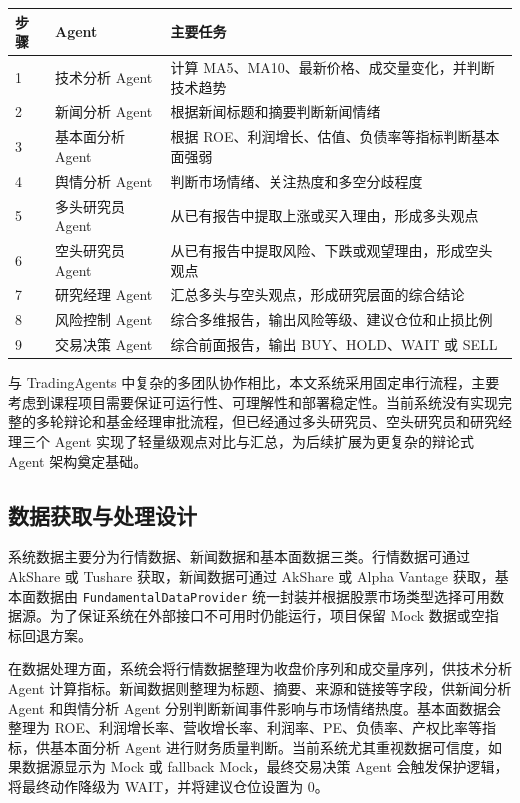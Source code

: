 \documentclass[UTF8,a4paper,12pt]{ctexart}
\begin{document}
\begin{center}
\begin{tabular}{lll}
\toprule
步骤 & Agent & 主要任务 \\
\midrule
1 & 技术分析 Agent & 计算 MA5、MA10、最新价格、成交量变化，并判断技术趋势 \\
2 & 新闻分析 Agent & 根据新闻标题和摘要判断新闻情绪 \\
3 & 基本面分析 Agent & 根据 ROE、利润增长、估值、负债率等指标判断基本面强弱 \\
4 & 舆情分析 Agent & 判断市场情绪、关注热度和多空分歧程度 \\
5 & 多头研究员 Agent & 从已有报告中提取上涨或买入理由，形成多头观点 \\
6 & 空头研究员 Agent & 从已有报告中提取风险、下跌或观望理由，形成空头观点 \\
7 & 研究经理 Agent & 汇总多头与空头观点，形成研究层面的综合结论 \\
8 & 风险控制 Agent & 综合多维报告，输出风险等级、建议仓位和止损比例 \\
9 & 交易决策 Agent & 综合前面报告，输出 BUY、HOLD、WAIT 或 SELL \\
\bottomrule
\end{tabular}
\end{center}

与 TradingAgents 中复杂的多团队协作相比，本文系统采用固定串行流程，主要考虑到课程项目需要保证可运行性、可理解性和部署稳定性。当前系统没有实现完整的多轮辩论和基金经理审批流程，但已经通过多头研究员、空头研究员和研究经理三个 Agent 实现了轻量级观点对比与汇总，为后续扩展为更复杂的辩论式 Agent 架构奠定基础。

\subsection{数据获取与处理设计}

系统数据主要分为行情数据、新闻数据和基本面数据三类。行情数据可通过 AkShare 或 Tushare 获取，新闻数据可通过 AkShare 或 Alpha Vantage 获取，基本面数据由 \texttt{FundamentalDataProvider} 统一封装并根据股票市场类型选择可用数据源。为了保证系统在外部接口不可用时仍能运行，项目保留 Mock 数据或空指标回退方案。

在数据处理方面，系统会将行情数据整理为收盘价序列和成交量序列，供技术分析 Agent 计算指标。新闻数据则整理为标题、摘要、来源和链接等字段，供新闻分析 Agent 和舆情分析 Agent 分别判断新闻事件影响与市场情绪热度。基本面数据会整理为 ROE、利润增长率、营收增长率、利润率、PE、负债率、产权比率等指标，供基本面分析 Agent 进行财务质量判断。当前系统尤其重视数据可信度，如果数据源显示为 Mock 或 fallback Mock，最终交易决策 Agent 会触发保护逻辑，将最终动作降级为 WAIT，并将建议仓位设置为 0。
\end{document}
